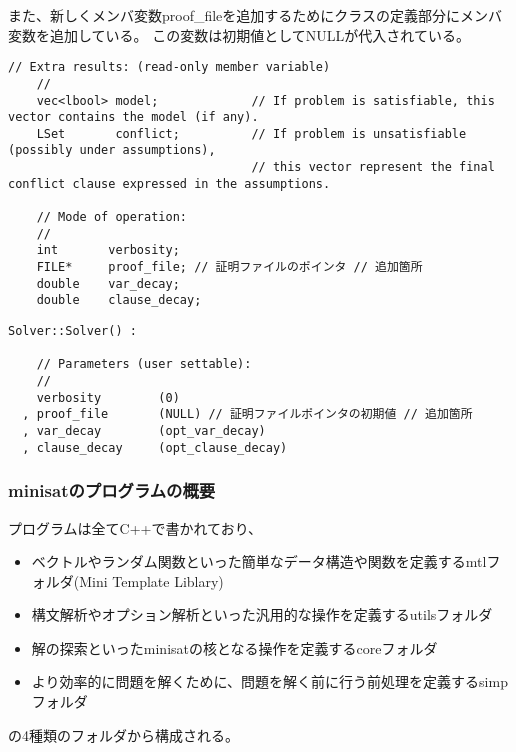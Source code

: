 また、新しくメンバ変数proof\_fileを追加するためにクラスの定義部分にメンバ変数を追加している。
この変数は初期値としてNULLが代入されている。
\begin{lstlisting}[caption=メンバ変数の追加(core/Solver.h), firstnumber=120]
    // Extra results: (read-only member variable)
    //
    vec<lbool> model;             // If problem is satisfiable, this vector contains the model (if any).
    LSet       conflict;          // If problem is unsatisfiable (possibly under assumptions),
                                  // this vector represent the final conflict clause expressed in the assumptions.

    // Mode of operation:
    //
    int       verbosity;
    FILE*     proof_file; // 証明ファイルのポインタ // 追加箇所
    double    var_decay;
    double    clause_decay;
\end{lstlisting}
\begin{lstlisting}[caption=メンバ変数の初期化(core/Solver.cc), firstnumber=54]
    Solver::Solver() :

    // Parameters (user settable):
    //
    verbosity        (0)
  , proof_file       (NULL) // 証明ファイルポインタの初期値 // 追加箇所
  , var_decay        (opt_var_decay)
  , clause_decay     (opt_clause_decay)
\end{lstlisting}








\subsubsection{minisatのプログラムの概要}

プログラムは全てC++で書かれており、
\begin{itemize}
	\item ベクトルやランダム関数といった簡単なデータ構造や関数を定義するmtlフォルダ(Mini Template Liblary)
	\item 構文解析やオプション解析といった汎用的な操作を定義するutilsフォルダ
	\item 解の探索といったminisatの核となる操作を定義するcoreフォルダ
	\item より効率的に問題を解くために、問題を解く前に行う前処理を定義するsimpフォルダ
\end{itemize}
の4種類のフォルダから構成される。

